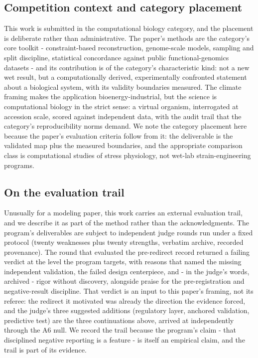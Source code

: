 \documentclass[12pt]{article}
\begin{document}
\subsection{Competition context and category placement}

This work is submitted in the computational biology category, and the
placement is deliberate rather than administrative. The paper's
methods are the category's core toolkit - constraint-based
reconstruction, genome-scale models, sampling and split discipline,
statistical concordance against public functional-genomics datasets -
and its contribution is of the category's characteristic kind: not a
new wet result, but a computationally derived, experimentally
confronted statement about a biological system, with its validity
boundaries measured. The climate framing makes the application
bioenergy-industrial, but the science is computational biology in
the strict sense: a virtual organism, interrogated at accession
scale, scored against independent data, with the audit trail that
the category's reproducibility norms demand. We note the category
placement here because the paper's evaluation criteria follow from
it: the deliverable is the validated map plus the measured
boundaries, and the appropriate comparison class is computational
studies of stress physiology, not wet-lab strain-engineering
programs.

\subsection{On the evaluation trail}

Unusually for a modeling paper, this work carries an external
evaluation trail, and we describe it as part of the method rather
than the acknowledgments. The program's deliverables are subject to
independent judge rounds run under a fixed protocol (twenty
weaknesses plus twenty strengths, verbatim archive, recorded
provenance). The round that evaluated the pre-redirect record
returned a failing verdict at the level the program targets, with
reasons that named the missing independent validation, the failed
design centerpiece, and - in the judge's words, archived - rigor
without discovery, alongside praise for the pre-registration and
negative-result discipline. That verdict is an input to this paper's
framing, not its referee: the redirect it motivated was already the
direction the evidence forced, and the judge's three suggested
additions (regulatory layer, anchored validation, predictive test)
are the three continuations above, arrived at independently through
the A6 null. We record the trail because the program's claim - that
disciplined negative reporting is a feature - is itself an empirical
claim, and the trail is part of its evidence.
\end{document}
